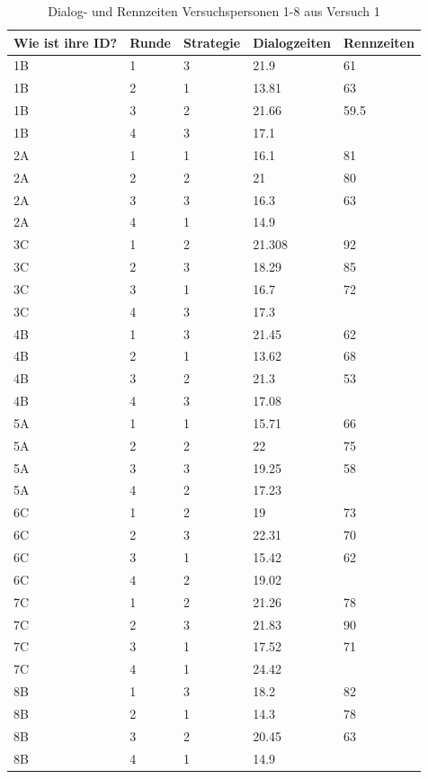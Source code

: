 \documentclass[12pt,a4paper]{scrartcl}
\begin{document}
\begin{appendix}
\begin{table}
\centering
\caption{Dialog- und Rennzeiten Versuchspersonen 1-8 aus Versuch 1}
\begin{tabular}{ | l | l | l | l | l | }
\hline
	Wie ist ihre ID? & Runde & Strategie & Dialogzeiten & Rennzeiten \\ \hline \hline
	1B & 1 & 3 & 21.9 & 61 \\ \hline
	1B & 2 & 1 & 13.81 & 63 \\ \hline
	1B & 3 & 2 & 21.66 & 59.5 \\ \hline
	1B & 4 & 3 & 17.1 &  \\ \hline
	\hline
	2A & 1 & 1 & 16.1 & 81 \\ \hline
	2A & 2 & 2 & 21 & 80 \\ \hline
	2A & 3 & 3 & 16.3 & 63 \\ \hline
	2A & 4 & 1 & 14.9 &  \\ \hline \hline
	3C & 1 & 2 & 21.308 & 92 \\ \hline
	3C & 2 & 3 & 18.29 & 85 \\ \hline
	3C & 3 & 1 & 16.7 & 72 \\ \hline
	3C & 4 & 3 & 17.3 &  \\ \hline \hline
	4B & 1 & 3 & 21.45 & 62 \\ \hline
	4B & 2 & 1 & 13.62 & 68 \\ \hline
	4B & 3 & 2 & 21.3 & 53 \\ \hline
	4B & 4 & 3 & 17.08 &  \\ \hline \hline
	5A & 1 & 1 & 15.71 & 66 \\ \hline
	5A & 2 & 2 & 22 & 75 \\ \hline
	5A & 3 & 3 & 19.25 & 58 \\ \hline
	5A & 4 & 2 & 17.23 &  \\ \hline \hline
	6C & 1 & 2 & 19 & 73 \\ \hline
	6C & 2 & 3 & 22.31 & 70 \\ \hline
	6C & 3 & 1 & 15.42 & 62 \\ \hline
	6C & 4 & 2 & 19.02 &  \\ \hline \hline
	7C & 1 & 2 & 21.26 & 78 \\ \hline
	7C & 2 & 3 & 21.83 & 90 \\ \hline
	7C & 3 & 1 & 17.52 & 71 \\ \hline
	7C & 4 & 1 & 24.42 &  \\ \hline \hline
	8B & 1 & 3 & 18.2 & 82 \\ \hline
	8B & 2 & 1 & 14.3 & 78 \\ \hline
	8B & 3 & 2 & 20.45 & 63 \\ \hline
	8B & 4 & 1 & 14.9 &  \\ \hline


\end{tabular}
\end{table}
\end{appendix}
\end{document}
